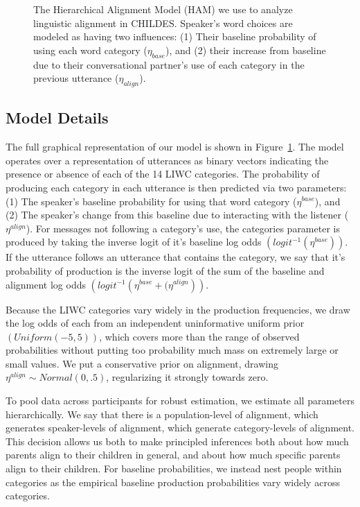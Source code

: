 \documentclass[10pt,letterpaper]{article}
\begin{document}
\begin{figure}[tb]
  \begin{center}
    
  \end{center}
  \caption{The Hierarchical Alignment Model (HAM) we use to analyze linguistic alignment in CHILDES. Speaker's word choices are modeled as having two influences: (1) Their baseline probability of using each word category ($\eta_{base}$), and (2) their increase from baseline due to their conversational partner's use of each category in the previous utterance ($\eta_{align}$).}
  \label{fig:model}
\end{figure}

\subsection{Model Details}

The full graphical representation of our model is shown in Figure~\ref{fig:model}. The model operates over a representation of utterances as binary vectors indicating the presence or absence of each of the 14 LIWC categories. The probability of producing each category in each utterance is then predicted via two parameters: (1) The speaker's baseline probability for using that word category ($\eta^{base}$), and (2) The speaker's change from this baseline due to interacting with the listener ($\eta^{align}$). For messages not following a category's use, the categories parameter is produced by taking the inverse logit of it's baseline log odds $\left(logit^{-1}\left(\eta^{base}\right)\right)$. If the utterance follows an utterance that contains the category, we say that it's probability of production is the inverse logit of the sum of the baseline and alignment log odds $\left(logit^{-1}\left(\eta^{base} + (\eta^{align}\right)\right)$.

Because the LIWC categories vary widely in the production frequencies, we draw the log odds of each from an independent uninformative uniform prior $\left(Uniform\left(-5,5\right)\right)$, which covers more than the range of observed probabilities without putting too probability much mass on extremely large or small values. We put a conservative prior on alignment, drawing $\eta^{align} \sim Normal(0,.5)$, regularizing it strongly towards zero.

To pool data across participants for robust estimation, we estimate all parameters hierarchically. We say that there is a population-level of alignment, which generates speaker-levels of alignment, which generate category-levels of alignment. This decision allows us both to make principled inferences both about how much parents align to their children in general, and about how much specific parents align to their children. For baseline probabilities, we instead nest people within categories as the empirical baseline production probabilities vary widely across categories.
\end{document}
